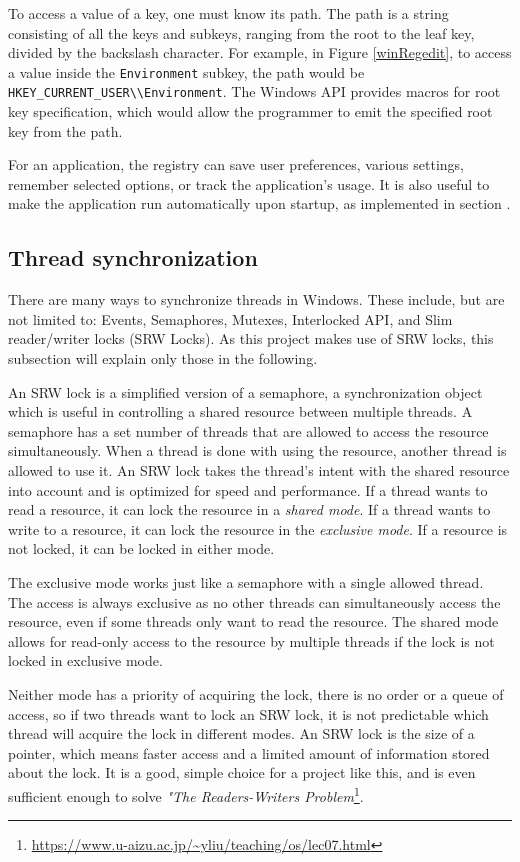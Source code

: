 To access a value of a key, one must know its path. The path is a string consisting of all the keys and subkeys, ranging from the root to the leaf key, divided by the backslash character.\cite{WinRegStruct}
For example, in Figure \ref{winRegedit}, to access a value inside the \lstinline{Environment} subkey, the path would be \lstinline{HKEY_CURRENT_USER\\Environment}. The Windows API provides macros for root key specification, which would allow the programmer to emit the specified root key from the path.

For an application, the registry can save user preferences, various settings, remember selected options, or track the application's usage. It is also useful to make the application run automatically upon startup, as implemented in section .

\subsection*{Thread synchronization}
There are many ways to synchronize threads in Windows. These include, but are not limited to: Events, Semaphores, Mutexes, Interlocked API, and Slim reader/writer locks (SRW Locks). As this project makes use of SRW locks, this subsection will explain only those in the following.\cite{WinSyncFuncs}

An SRW lock is a simplified version of a semaphore, a synchronization object which is useful in controlling a shared resource between multiple threads. A semaphore has a set number of threads that are allowed to access the resource simultaneously. When a thread is done with using the resource, another thread is allowed to use it.\cite{WinSemaphores} An SRW lock takes the thread's intent with the shared resource into account and is optimized for speed and performance. If a thread wants to read a resource, it can lock the resource in a \textit{shared mode}. If a thread wants to write to a resource, it can lock the resource in the \textit{exclusive mode}. If a resource is not locked, it can be locked in either mode. 

The exclusive mode works just like a semaphore with a single allowed thread. The access is always exclusive as no other threads can simultaneously access the resource, even if some threads only want to read the resource.
The shared mode allows for read-only access to the resource by multiple threads if the lock is not locked in exclusive mode.

Neither mode has a priority of acquiring the lock, there is no order or a queue of access, so if two threads want to lock an SRW lock, it is not predictable which thread will acquire the lock in different modes. An SRW lock is the size of a pointer, which means faster access and a limited amount of information stored about the lock. It is a good, simple choice for a project like this, and is even sufficient enough to solve \textit{"The Readers-Writers Problem}\footnote{\url{https://www.u-aizu.ac.jp/~yliu/teaching/os/lec07.html}}.
\cite{WinSRW}

